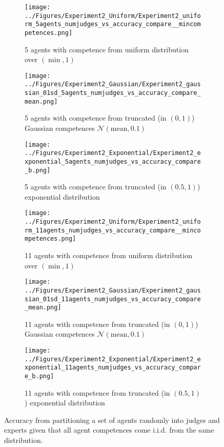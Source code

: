 \documentclass[letterpaper]{article} %
\begin{document}
\begin{figure*}[t]
\centering
\begin{subfigure}{0.3\textwidth}
 \texttt{[image: ../Figures/Experiment2\_Uniform/Experiment2\_uniform\_5agents\_numjudges\_vs\_accuracy\_compare\_\_mincompetences.png]}
 \caption{5 agents with competence from uniform distribution over $(\min,1)$}
\label{fig:5_uniform}
\end{subfigure}
\hfill
\begin{subfigure}{0.3\textwidth}
 \texttt{[image: ../Figures/Experiment2\_Gaussian/Experiment2\_gaussian\_01sd\_5agents\_numjudges\_vs\_accuracy\_compare\_mean.png]}
 \caption{5 agents with competence from truncated (in $(0,1)$) Gaussian competences $\mathcal{N}(\text{mean},0.1)$}
 \label{fig:5_gauss}
\end{subfigure}
\hfill
\begin{subfigure}{0.3\textwidth}
 \texttt{[image: ../Figures/Experiment2\_Exponential/Experiment2\_exponential\_5agents\_numjudges\_vs\_accuracy\_compare\_b.png]}
 \caption{5 agents with competence from truncated (in $(0.5,1)$) exponential distribution}
\label{fig:5_exponential}
\end{subfigure}
\hfill
 \begin{subfigure}{0.3\textwidth}
 \texttt{[image: ../Figures/Experiment2\_Uniform/Experiment2\_uniform\_11agents\_numjudges\_vs\_accuracy\_compare\_\_mincompetences.png]}
 \caption{11 agents with competence from uniform distribution over $(\min,1)$}
\label{fig:11_uniform}
\end{subfigure}
\hfill
\begin{subfigure}{0.3\textwidth}
 \texttt{[image: ../Figures/Experiment2\_Gaussian/Experiment2\_gaussian\_01sd\_11agents\_numjudges\_vs\_accuracy\_compare\_mean.png]}
 \caption{11 agents with competence from truncated (in $(0,1)$) Gaussian competences $\mathcal{N}(\text{mean},0.1)$}
 \label{fig:11_gauss}
\end{subfigure}
\hfill
\begin{subfigure}{0.3\textwidth}
 \texttt{[image: ../Figures/Experiment2\_Exponential/Experiment2\_exponential\_11agents\_numjudges\_vs\_accuracy\_compare\_b.png]}
 \caption{11 agents with competence from truncated (in $(0.5,1)$) exponential distribution}
\label{fig:11_exponential}
\end{subfigure}
\caption{Accuracy from partitioning a set of agents randomly into judges and experts given that all agent competences come i.i.d. from the same distribution.%
}
\label{fig:partition}
\end{figure*}
\end{document}
